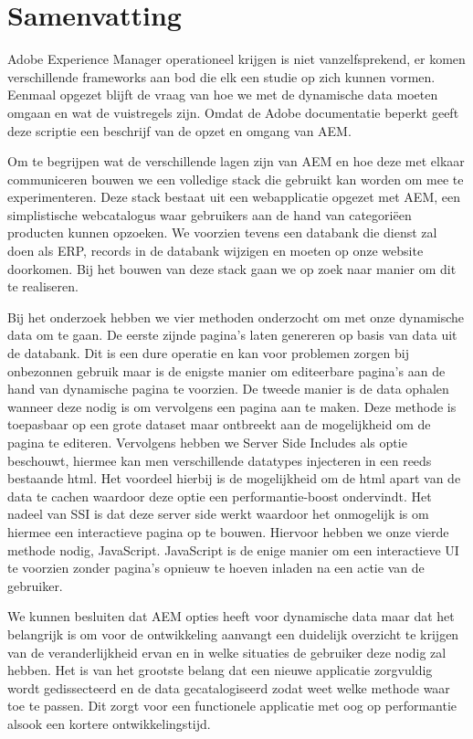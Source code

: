 \documentclass{article}
\begin{document}
	\section{Samenvatting}
Adobe Experience Manager operationeel krijgen is niet vanzelfsprekend, er komen verschillende frameworks aan bod die elk een studie op zich kunnen vormen. Eenmaal opgezet blijft de vraag van hoe we met de dynamische data moeten omgaan en wat de vuistregels zijn. Omdat de Adobe documentatie beperkt geeft deze scriptie een beschrijf van de opzet en omgang van AEM.
\par
Om te begrijpen wat de verschillende lagen zijn van AEM en hoe deze met elkaar communiceren bouwen we een volledige stack die gebruikt kan worden om mee te experimenteren. Deze stack bestaat uit een webapplicatie opgezet met AEM, een simplistische webcatalogus waar gebruikers aan de hand van categori\"een producten kunnen opzoeken. We voorzien tevens een databank die dienst zal doen als ERP, records in de databank wijzigen en moeten op onze website doorkomen. Bij het bouwen van deze stack gaan we op zoek naar manier om dit te realiseren.
\par
Bij het onderzoek hebben we vier methoden onderzocht om met onze dynamische data om te gaan. De eerste zijnde pagina's laten genereren op basis van data uit de databank. Dit is een dure operatie en kan voor problemen zorgen bij onbezonnen gebruik maar is de enigste manier om editeerbare pagina's aan de hand van dynamische pagina te voorzien. De tweede manier is de data ophalen wanneer deze nodig is om vervolgens een pagina aan te maken. Deze methode is toepasbaar op een grote dataset maar ontbreekt aan de mogelijkheid om de pagina te editeren. Vervolgens hebben we Server Side Includes als optie beschouwt, hiermee kan men verschillende datatypes injecteren in een reeds bestaande html. Het voordeel hierbij is de mogelijkheid om de html apart van de data te cachen waardoor deze optie een performantie-boost ondervindt. Het nadeel van SSI is dat deze server side werkt waardoor het onmogelijk is om hiermee een interactieve pagina op te bouwen. Hiervoor hebben we onze vierde methode nodig, JavaScript. JavaScript is de enige manier om een interactieve UI te voorzien zonder pagina's opnieuw te hoeven inladen na een actie van de gebruiker.
\par
We kunnen besluiten dat AEM opties heeft voor dynamische data maar dat het belangrijk is om voor de ontwikkeling aanvangt een duidelijk overzicht te krijgen van de veranderlijkheid ervan en in welke situaties de gebruiker deze nodig zal hebben. Het is van het grootste belang dat een nieuwe applicatie zorgvuldig wordt gedissecteerd en de data gecatalogiseerd zodat weet welke methode waar toe te passen. Dit zorgt voor een functionele applicatie met oog op performantie alsook een kortere ontwikkelingstijd.
\end{document}
